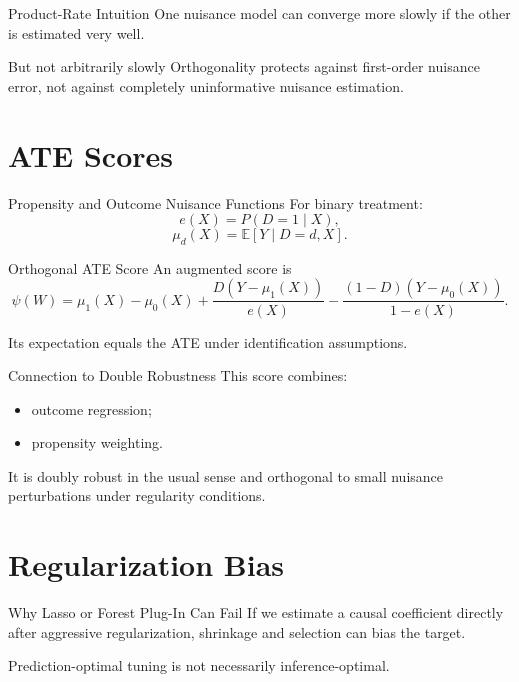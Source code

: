 \documentclass[aspectratio=169,11pt]{beamer}
\newcommand{\E}{\mathbb{E}}
\begin{document}
\begin{frame}{Product-Rate Intuition}
One nuisance model can converge more slowly if the other is estimated very well.

\begin{alertblock}{But not arbitrarily slowly}
Orthogonality protects against first-order nuisance error, not against completely uninformative nuisance estimation.
\end{alertblock}
\end{frame}

\section{ATE Scores}

\begin{frame}{Propensity and Outcome Nuisance Functions}
For binary treatment:
\[
e(X)=P(D=1\mid X),
\]
\[
\mu_d(X)=\E[Y\mid D=d,X].
\]
\end{frame}

\begin{frame}{Orthogonal ATE Score}
An augmented score is
\[
\psi(W)
=
\mu_1(X)-\mu_0(X)
+
\frac{D(Y-\mu_1(X))}{e(X)}
-
\frac{(1-D)(Y-\mu_0(X))}{1-e(X)}.
\]

Its expectation equals the ATE under identification assumptions.
\end{frame}

\begin{frame}{Connection to Double Robustness}
This score combines:
\begin{itemize}
\item outcome regression;
\item propensity weighting.
\end{itemize}

It is doubly robust in the usual sense and orthogonal to small nuisance perturbations under regularity conditions.
\end{frame}

\section{Regularization Bias}

\begin{frame}{Why Lasso or Forest Plug-In Can Fail}
If we estimate a causal coefficient directly after aggressive regularization, shrinkage and selection can bias the target.

Prediction-optimal tuning is not necessarily inference-optimal.
\end{frame}
\end{document}

